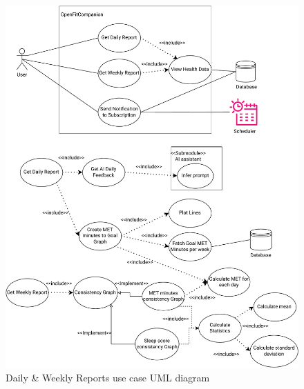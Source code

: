 \begin{figure}
    
    \centering
    \includegraphics[width=\textwidth,height=\textheight,keepaspectratio]{../images/reports.pdf}
    \caption{Daily \& Weekly Reports use case UML diagram}
    \label{fig:4}
    
\end{figure}

